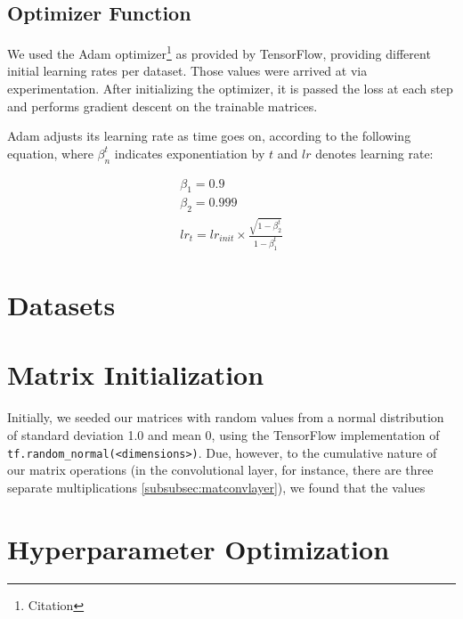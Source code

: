 \subsection{Optimizer Function}
\label{subsec:optimizer}
We used the Adam optimizer\footnote{Citation} as provided by TensorFlow, 
providing different initial learning rates per dataset. Those values were 
arrived at via experimentation. After initializing the optimizer, it is passed 
the loss at each step and performs gradient descent on the trainable matrices.

Adam adjusts its learning rate as time goes on, according to the following 
equation, where $\beta_n^t$ indicates exponentiation by $t$ and $lr$ denotes 
learning rate:
\begin{figure}[h]
	\begin{minipage}[b]{.38\textwidth}
		\centering
		\begin{gather}
			\nonumber
			\beta_1 = 0.9\\
			\nonumber
			\beta_2 = 0.999\\
			\nonumber
			lr_t = lr_{init} \times \frac{\sqrt{1-\beta_2^t}}{1-\beta_1^t}
		\end{gather}
	\end{minipage}
	\hfill
	\begin{minipage}{.6\textwidth}
		\centering
	\end{minipage}
\end{figure}

\section{Datasets}


\section{Matrix Initialization}
Initially, we seeded our matrices with random values from a normal distribution 
of standard deviation 1.0 and mean 0, using the TensorFlow implementation of 
\texttt{tf.random\_normal(<dimensions>)}. Due, however, to the cumulative nature 
of our matrix operations (in the convolutional layer, for instance, there are 
three separate multiplications \ref{subsubsec:matconvlayer}), we found that the 
values 

\section{Hyperparameter Optimization}
